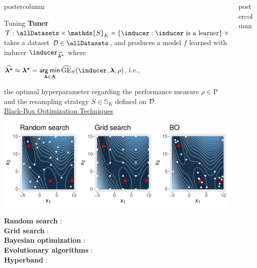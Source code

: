 \documentclass{beamer}
\newlength{\columnheight} %
\begin{document}
\begin{frame}[fragile]{}
\begin{columns}
\begin{column}{.31\textwidth}
\begin{beamercolorbox}[center]{postercolumn}
\begin{minipage}{.98\textwidth}
{\begin{myblock}{Tuning}
\textbf{Tuner} $\mathcal{T}: \allDatasets \times \mathds{S}_K \times \{\inducer: \inducer \textrm{ is a learner}\} \times \mathrm{P} \rightarrow \Hspace$ takes a dataset $\D \in \allDatasets$, and produces a model $f$ learned with inducer $\inducer_{\boldsymbol{\widehat{\lambda^*}}}$ where
\begin{center}$\boldsymbol{\widehat{\lambda^*}} \approx \boldsymbol{\lambda^*} = \argmin \limits_{\boldsymbol{\lambda} \in \bm{\Lambda}} \widehat{\mathrm{GE}}_S(\inducer, \boldsymbol\lambda, \rho)$, i.e.,\end{center} the optimal hyperparameter regarding the performance measure $\rho \in \mathrm{P}$ and the resampling strategy $S \in \mathds{S}_K$ defined on $\mathcal{D}$.\\

\underline{Black-Box Optimization Techniques}\\

 \begin{center}
             \includegraphics[width=0.95\columnwidth]{figure/bb_cmp.pdf}
               \end{center}
\textbf{Random search} : \\

\textbf{Grid search} : \\ 

\textbf{Bayesian optimization} : \\

\textbf{Evolutionary algorithms} : \\

\textbf{Hyperband} : \\

\end{myblock}



				}
			\end{minipage}
		\end{beamercolorbox}
	\end{column}
	\begin{column}{.31\textwidth}
		\begin{beamercolorbox}[center]{postercolumn}
			\begin{minipage}{.98\textwidth}
				\parbox[t][\columnheight]{\textwidth}{


}
\end{minipage}
\end{beamercolorbox}
\end{column}
\end{columns}
\end{frame}
\end{document}
